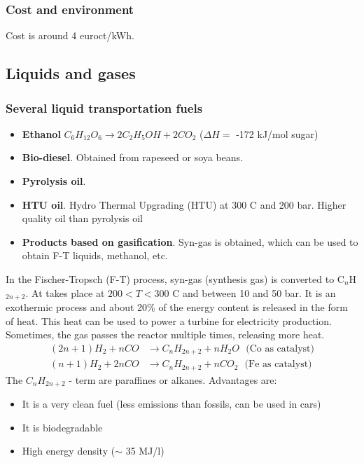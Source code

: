 \documentclass[a4paper,10pt]{article}
\begin{document}
\subsubsection{Cost and environment}
Cost is around 4 euroct/kWh.


\subsection{Liquids and gases}
\subsubsection{Several liquid transportation fuels}
\begin{itemize}
 \item \textbf{Ethanol} $C_6H_{12}O_6 \rightarrow 2C_2H_5OH + 2CO_2$ ($\Delta H =$ -172 kJ/mol sugar)
 \item \textbf{Bio-diesel}. Obtained from rapeseed or soya beans. 
 \item \textbf{Pyrolysis oil}. 
 \item \textbf{HTU oil}. Hydro Thermal Upgrading (HTU) at 300 C and 200 bar. Higher quality oil than pyrolysis oil
 \item \textbf{Products based on gasification}. Syn-gas is obtained, which can be used to obtain F-T liquids, methanol, etc.
\end{itemize}

In the Fischer-Tropsch (F-T) process, syn-gas (synthesis gas) is converted to C$_n$H$_{2n+2}$. At takes place at $200<T<300$ C and between 10 and 50 bar. It is an exothermic process and about 20\% of the energy content is released in the form of heat. This heat can be used to power a turbine for electricity production. Sometimes, the gas passes the reactor multiple times, releasing more heat. 
\begin{align}
 (2n+1)H_2 + nCO &\rightarrow C_nH_{2n+2} + nH_2O \ \ \ \text{(Co as catalyst)} \\
 (n+1)H_2 + 2nCO &\rightarrow C_nH_{2n+2} + nCO_2 \ \ \ \text{(Fe as catalyst)}
\end{align}
The $C_nH_{2n+2}$ - term are paraffines or alkanes. Advantages are:
\begin{itemize}
 \item It is a very clean fuel (less emissions than fossils, can be used in cars)
 \item It is biodegradable
 \item High energy density ($\sim$ 35 MJ/l)
\end{itemize}
\end{document}
